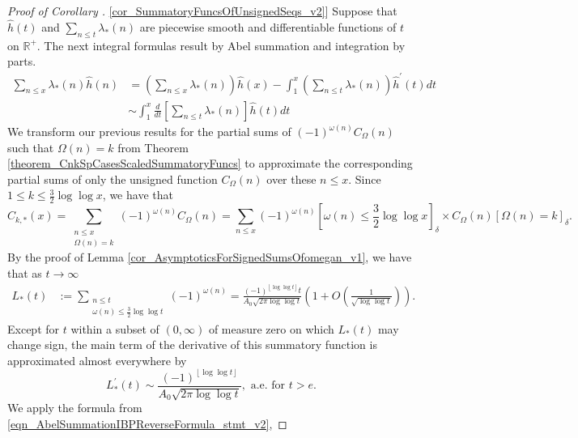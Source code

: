 \documentclass[11pt,reqno,a4letter]{article}
\newcommand{\hlocalref}[1]{\hyperref[#1]{\ref{#1}}}
\numberwithin{equation}{section}
\numberwithin{figure}{section}
\numberwithin{table}{section}
\newcommand{\Iverson}[1]{\ensuremath{\left[#1\right]_{\delta}}}
\newcommand{\floor}[1]{\left\lfloor #1 \right\rfloor}
\theoremstyle{plain}
\numberwithin{theorem}{section}
\theoremstyle{definition}
\begin{document}
\begin{proof}[Proof of Corollary \hlocalref{cor_SummatoryFuncsOfUnsignedSeqs_v2}]  
Suppose that $\hat{h}(t)$ and $\sum_{n \leq t} \lambda_{\ast}(n)$ are 
piecewise smooth and differentiable functions of $t$ on $\mathbb{R}^{+}$. 
The next integral formulas result by 
Abel summation and integration by parts. 
\begin{subequations}
\begin{align} 
\label{eqn_AbelSummationIBPReverseFormula_stmt_v1} 
     \sum_{n \leq x} \lambda_{\ast}(n) \hat{h}(n) & = 
     \left(\sum_{n \leq x} \lambda_{\ast}(n)\right) \hat{h}(x) - 
     \int_{1}^{x} \left(\sum_{n \leq t} \lambda_{\ast}(n)\right) \hat{h}^{\prime}(t) dt \\ 
\label{eqn_AbelSummationIBPReverseFormula_stmt_v2}
     & \sim 
     \int_1^{x} \frac{d}{dt}\left[\sum_{n \leq t} \lambda_{\ast}(n)\right] \hat{h}(t) dt
\end{align} 
\end{subequations}
We transform our previous results for the partial sums of 
$(-1)^{\omega(n)} C_{\Omega}(n)$ such that $\Omega(n) = k$ from 
Theorem \hlocalref{theorem_CnkSpCasesScaledSummatoryFuncs} to approximate 
the corresponding partial sums of only the unsigned function $C_{\Omega}(n)$ over these $n \leq x$. 
Since $1 \leq k \leq \frac{3}{2} \log\log x$, we have that 
\[
\widehat{C}_{k,\ast}(x) = 
     \sum_{\substack{n \leq x \\ \Omega(n)=k}} (-1)^{\omega(n)} C_{\Omega}(n) = 
     \sum_{n \leq x} (-1)^{\omega(n)} \Iverson{\omega(n) \leq \frac{3}{2} \log\log x} \times 
     C_{\Omega}(n) \Iverson{\Omega(n) = k}. 
\]
By the proof of Lemma \hlocalref{cor_AsymptoticsForSignedSumsOfomegan_v1}, we have 
that as $t \rightarrow \infty$ 
\begin{align} 
\label{eqn_ProofTag_LAsttSummatoryFuncAsymptotics_v1}
L_{\ast}(t) & := \sum_{\substack{n \leq t \\ \omega(n) \leq \frac{3}{2} \log\log t}} 
     (-1)^{\omega(n)} 
     = \frac{(-1)^{\floor{\log\log t}} t}{A_0 \sqrt{2\pi \log\log t}}\left(1 + 
     O\left(\frac{1}{\sqrt{\log\log t}}\right)\right). 
\end{align} 
Except for $t$ within a subset of $(0, \infty)$ of measure zero on which 
$L_{\ast}(t)$ may change sign, the main term of the derivative of this summatory function 
is approximated almost everywhere by 
\[
L_{\ast}^{\prime}(t) \sim \frac{(-1)^{\floor{\log\log t}}}{A_0 \sqrt{2\pi \log\log t}}, 
     \text{ a.e.\ for } t > e. 
\]
We apply the formula from \eqref{eqn_AbelSummationIBPReverseFormula_stmt_v2},  

\end{proof}
\end{document}
